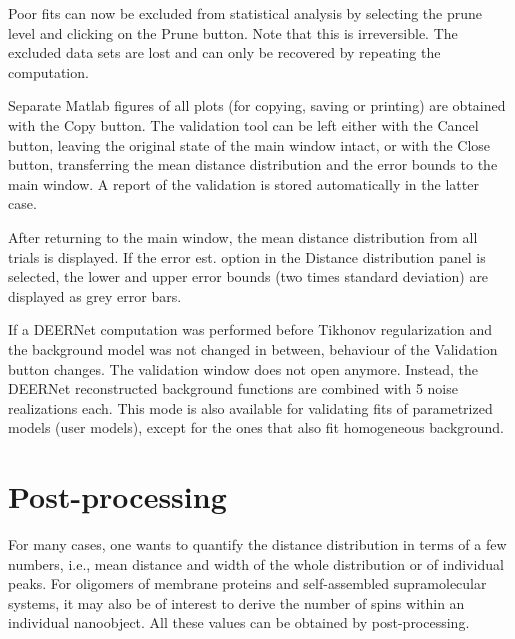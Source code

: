 \documentclass{article}
\begin{document}
Poor fits can now be excluded from statistical analysis by selecting the prune level and clicking on the {\ttfamily Prune} button. Note that this is irreversible. The excluded data sets are lost and can only be recovered by repeating the computation.

Separate Matlab figures of all plots (for copying, saving or printing) are obtained with the {\ttfamily Copy} button. The validation tool can be left either with the {\ttfamily Cancel} button, leaving the original state of the main window intact, or with the {\ttfamily Close} button, transferring the mean distance distribution and the error bounds to the main window. A report of the validation is stored automatically in the latter case.

After returning to the main window, the mean distance distribution from all trials is displayed. If the {\ttfamily error est.} option in the {\ttfamily Distance distribution} panel is selected, the lower and upper error bounds (two times standard deviation) are displayed as grey error bars.

If a DEERNet computation was performed before Tikhonov regularization and the background model was not changed in between, behaviour of the {\ttfamily Validation} button changes. The validation window does not open anymore. Instead, the DEERNet reconstructed background functions are combined with 5 noise realizations each. This mode is also available for validating fits of parametrized models (user models), except for the ones that also fit homogeneous background.

\section{Post-processing}
\label{postprocess}
For many cases, one wants to quantify the distance distribution in terms of a few
numbers, i.e., mean distance and width of the whole distribution or of individual
peaks. For oligomers of membrane proteins and self-assembled supramolecular
systems, it may also be of interest to derive the number of spins within an
individual nanoobject. All these values can be obtained by post-processing.
\end{document}
